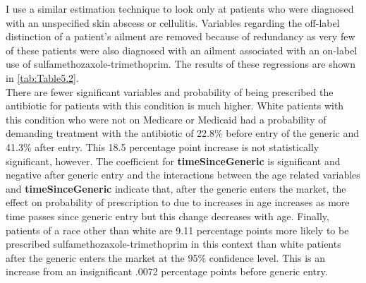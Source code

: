 
\newpage
I use a similar estimation technique to look only at patients who were diagnosed with an unspecified skin abscess or cellulitis. Variables regarding the off-label distinction of a patient's ailment are removed because of redundancy as very few of these patients were also diagnosed with an ailment associated with an on-label use of sulfamethozaxole-trimethoprim. The results of these regressions are shown in \autoref{tab:Table5.2}.\\
\indent There are fewer significant variables and probability of being prescribed the antibiotic for patients with this condition is much higher. White patients with this condition who were not on Medicare or Medicaid had a probability of demanding treatment with the antibiotic of 22.8\% before entry of the generic and 41.3\% after entry. This 18.5 percentage point increase is not statistically significant, however. The coefficient for \textbf{timeSinceGeneric} is significant and negative after generic entry and the interactions between the age related variables and \textbf{timeSinceGeneric} indicate that, after the generic enters the market, the effect on probability of prescription to due to increases in age increases as more time passes since generic entry but this change decreases with age. Finally, patients of a race other than white are 9.11 percentage points more likely to be prescribed sulfamethozaxole-trimethoprim in this context than white patients after the generic enters the market at the 95\% confidence level. This is an increase from an insignificant .0072 percentage points before generic entry.

